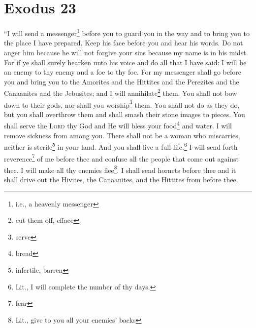 \section{Exodus 23}\label{Exodus 23}
\begin{enumerate}[align=center]
     ``I will send a messenger\footnote{i.e., a heavenly messenger} before you to guard you in the way and to bring you to the place I have prepared.%
     Keep his face before you and hear his words. Do not anger him because he will not forgive your sins because my name is in his midst.%
     For if ye shall surely hearken unto his voice and do all that I have said: I will be an enemy to thy enemy and a foe to thy foe.%
     For my messenger shall go before you and bring you to the Amorites and the Hittites and the Perezites and the Canaanites and the Jebusites; and I will annihilate\footnote{cut them off, efface} them.%
     You shall not bow down to their gods, nor shall you worship\footnote{serve} them. You shall not do as they do, but you shall overthrow them and shall smash their stone images to pieces.%
     You shall serve the \textsc{Lord} thy God and He will bless your food\footnote{bread} and water. I will remove sickness from among you.%
     There shall not be a woman who miscarries, neither is sterile\footnote{infertile, barren} in your land. And you shall live a full life.\footnote{Lit., I will complete the number of thy days.}%
     I will send forth reverence\footnote{fear} of me before thee and confuse all the people that come out against thee. I will make all thy enemies flee\footnote{Lit., give to you all your enemies' backs}.%
     I shall send hornets before thee and it shall drive out the Hivites, the Canaanites, and the Hittites from before thee.%

\end{enumerate}
